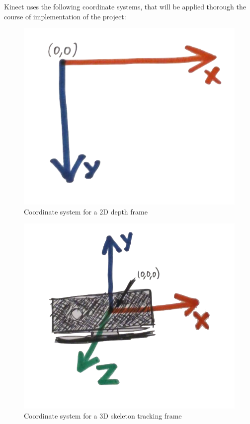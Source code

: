 \documentclass[a4paper,11pt,oneside]{article}
\begin{document}
Kinect uses the following coordinate systems, that will be applied thorough the course of implementation of the project:

  \begin{figure}[H]
  \centering
  \includegraphics[scale=0.4]{coordinate-2d.png}
  \caption{Coordinate system for a 2D depth frame}
  \end{figure}

  \begin{figure}[H]
  \centering
  \includegraphics[scale=0.3]{coordinate-3d.png}
  \caption{Coordinate system for a 3D skeleton tracking frame}
  \end{figure}
\end{document}
